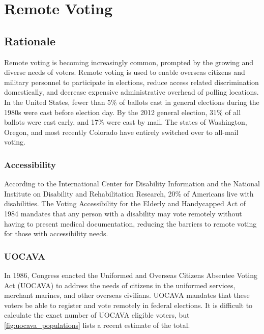 \chapter{Remote Voting}
\label{chapter:remote_voting}

\section{Rationale}
Remote voting is becoming increasingly common, prompted by the growing
and diverse needs of voters. Remote voting is used to enable overseas
citizens and military personnel to participate in elections, reduce
access related discrimination domestically, and decrease expensive
administrative overhead of polling locations.  In the United States,
fewer than 5\% of ballots cast in general elections during the 1980s
were cast before election day. By the 2012 general election, 31\% of
all ballots were cast early, and 17\% were cast by mail. The states of
Washington, Oregon, and most recently Colorado have entirely switched
over to all-mail voting.

\subsection{Accessibility}
According to the International Center for Disability Information and
the National Institute on Disability and Rehabilitation Research, 20\%
of Americans live with disabilities. The Voting Accessibility for the
Elderly and Handycapped Act of 1984 mandates that any person with a
disability may vote remotely without having to present medical
documentation, reducing the barriers to remote voting for those with
accessibility needs.


\subsection{UOCAVA}
In 1986, Congress enacted the Uniformed and Overseas Citizens Absentee
Voting Act (UOCAVA) to address the needs of citizens in the uniformed
services, merchant marines, and other overseas civilians. UOCAVA
mandates that these voters be able to register and vote remotely in
federal elections. It is difficult to calculate the exact number of
UOCAVA eligible voters, but \autoref{fig:uocava_populations} lists a
recent estimate of the total.

